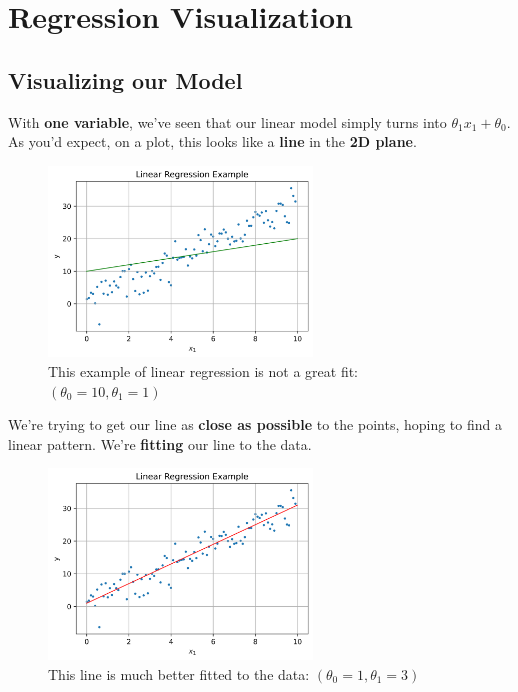 \section*{Regression Visualization}

    \subsection*{Visualizing our Model}
    
        With \textbf{one variable}, we've seen that our linear model simply turns into $\theta_1 x_1  + \theta_0$. As you'd expect, on a plot, this looks like a \textbf{line} in the \textbf{2D plane}.
        
        \begin{figure}[H]
        \centering
            \includegraphics[width=70mm,scale=0.5]{images/regression_images/Regression_Example_Poor_Fit.png}
        
            \caption*{This example of linear regression is not a great fit: $(\theta_0=10, \theta_1=1)$}
        \end{figure}
        
        We're trying to get our line as \textbf{close as possible} to the points, hoping to find a linear pattern. We're \textbf{fitting} our line to the data.
        
        \begin{figure}[H]
        \centering
            \includegraphics[width=70mm,scale=0.5]{images/regression_images/Regression_Example_Good_Fit.png}
        
            \caption*{This line is much better fitted to the data: $(\theta_0=1, \theta_1=3)$}
        \end{figure}
        
